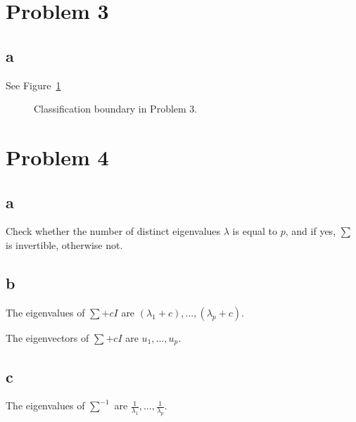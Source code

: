 \documentclass[a4paper,11pt]{article}
\theoremstyle{mytheor}
\begin{document}
\section*{Problem 3}
\subsection*{a}
See Figure~\ref{fig:3}
\begin{figure}[h]
	\caption{Classification boundary in Problem 3.}
	\label{fig:3}
\end{figure}

\section*{Problem 4}
\subsection*{a}
Check whether the number of distinct eigenvalues $\lambda$ is equal to $p$, and
if yes, $\sum$ is invertible, otherwise not.

\subsection*{b}
The eigenvalues of $\sum + c I$ are $(\lambda_1 + c), ... , (\lambda_p + c)$.

The eigenvectors of $\sum + c I$ are $u_1, ..., u_p$.

\subsection*{c}
The eigenvalues of $\sum^{-1}$ are $\frac{1}{\lambda_1}, ... , \frac{1}{\lambda_p} $.
\end{document}
